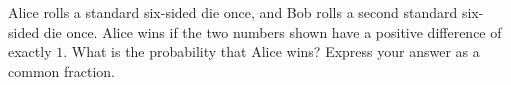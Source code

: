 Alice rolls a standard six-sided die once, and Bob rolls a second standard six-sided die once. Alice wins if the two numbers shown have a positive difference of exactly $1$. What is the probability that Alice wins? Express your answer as a common fraction.
